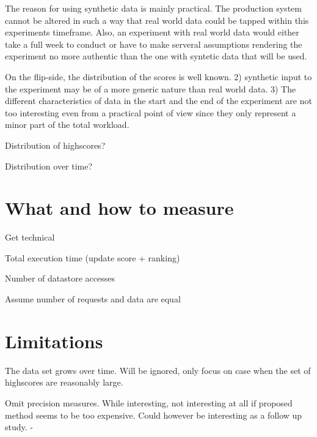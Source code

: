 The reason for using synthetic data is mainly practical. The production system cannot be altered in such a way that real world data could be tapped within this experiments timeframe. Also, an experiment with real world data would either take a full week to conduct or have to make serveral assumptions rendering the experiment no more authentic than the one with syntetic data that will be used.

On the flip-side, the distribution of the scores is well known. 2) synthetic input to the experiment may be of a more generic nature than real world data. 3) The different characteristics of data in the start and the end of the experiment are not too interesting even from a practical point of view since they only represent a minor part of the total workload.

\begin{shaded}

  Distribution of highscores?

  Distribution over time?
 
\end{shaded}

\section{What and how to measure}

Get technical

Total execution time (update score + ranking)

Number of datastore accesses

Assume number of requests and data are equal

\section{Limitations}

The data set grows over time. Will be ignored, only focus on case when the set of highscores are reasonably large.

Omit precision measures. While interesting, not interesting at all if proposed method seems to be too expensive. Could however be interesting as a follow up study. -
